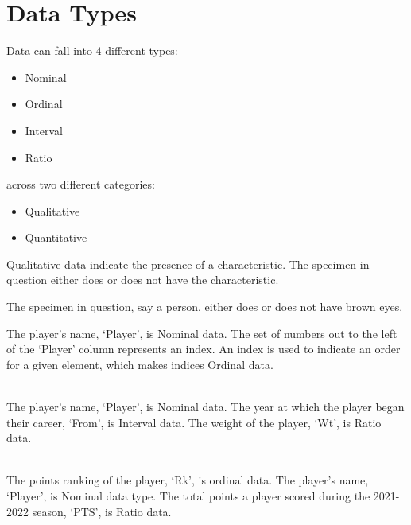 \section{Data Types}

Data can fall into $4$ different types:
\begin{itemize}
    \item Nominal
    \item Ordinal
    \item Interval
    \item Ratio
\end{itemize}
across two different categories:
\begin{itemize}
    \item Qualitative
    \item Quantitative
\end{itemize}
Qualitative data indicate the presence of a characteristic. The specimen in question either does or does not have the characteristic. 
\begin{example}
The specimen in question, say a person, either does or does not have brown eyes.
\end{example}

\begin{dataset}
The player's name, `Player', is Nominal data. The set of numbers out to the left of the `Player' column represents an index. An index is used to indicate an order for a given element, which makes indices Ordinal data. \\[1ex]
\\[4ex]
\end{dataset}

\begin{dataset}
The player's name, `Player', is Nominal data. The year at which the player began their career, `From', is Interval data. The weight of the player, `Wt', is Ratio data.\\[1ex]
\\[4ex]
\end{dataset}

\begin{dataset}
The points ranking of the player, `Rk', is ordinal data. The player's name, `Player', is Nominal data type. The total points a player scored during the 2021-2022 season, `PTS', is Ratio data.\\[1ex]
\\[4ex]
\end{dataset}